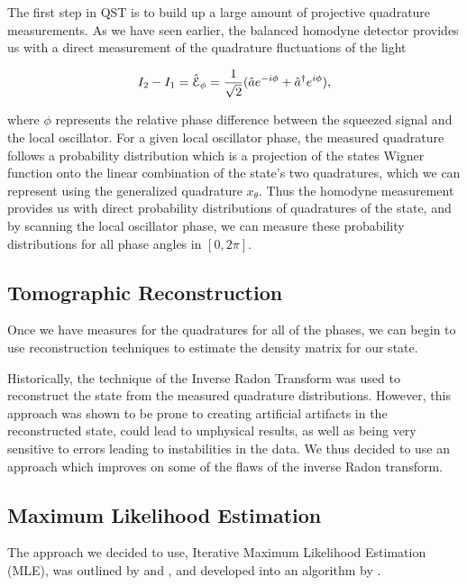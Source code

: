 The first step in QST is to build up a large amount of projective quadrature measurements.  As we have seen earlier, the balanced homodyne detector provides us with a direct measurement of the quadrature fluctuations of the light

\begin{equation}
  \label{eq:bhd_quad}
    I_2 - I_1 = \hat{\mathcal{E}}_\phi = \frac{1}{\sqrt{2}} (\hat{a} e^{-i \phi } + \hat{a}^\dagger e^{i \phi })  ,
\end{equation}

\noindent
where $\phi $ represents the relative phase difference between the squeezed signal and the local oscillator.  For a given local oscillator phase, the measured quadrature follows a probability distribution which is a projection of the states Wigner function onto the linear combination of the state's two quadratures, which we can represent using the generalized quadrature $x_\theta$.  Thus the homodyne measurement provides us with direct probability distributions of quadratures of the state, and by scanning the local oscillator phase, we can measure these probability distributions for all phase angles in $[0, 2\pi]$.


\subsection{Tomographic Reconstruction} 
\label{tomographic_reconstruction} 

Once we have measures for the quadratures for all of the phases, we can begin to use reconstruction techniques to estimate the density matrix for our state.

Historically, the technique of the Inverse Radon Transform \cite{leonhardt1997measuring} was used to reconstruct the state from the measured quadrature distributions.  However, this approach was shown to be prone to creating artificial artifacts in the reconstructed state, could lead to unphysical results, as well as being very sensitive to errors leading to instabilities in the data.  We thus decided to use an approach which improves on some of the flaws of the inverse Radon transform.

 
  
\subsection{Maximum Likelihood Estimation} 
\label{maximum_likelihood_estimation} 

The approach we decided to use, Iterative Maximum Likelihood Estimation (MLE), was outlined by \cite{PhysRevA.61.010304} and \cite{PhysRevA.63.040303}, and developed into an algorithm by \cite{lvovsky2004}.
 

